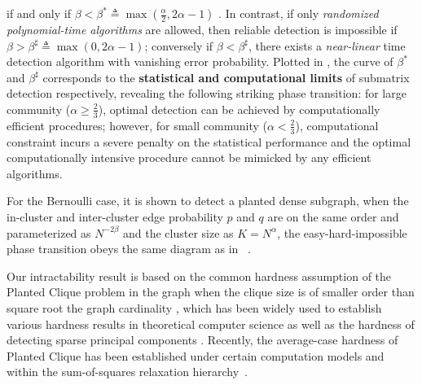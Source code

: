 if and only if $\beta < \beta^* \triangleq \max(\frac{\alpha}{2}, 2\alpha-1)$
 \cite{butucea2013}.
In contrast, if only \emph{randomized polynomial-time algorithms} are allowed, then reliable detection is impossible if $\beta > \beta^\sharp \triangleq \max(0, 2\alpha-1)$; conversely if $\beta < \beta^\sharp$, there exists a \emph{near-linear} time detection algorithm with vanishing error probability. Plotted in , the curve of $\beta^*$ and $\beta^\sharp$ corresponds to the  \textbf{statistical and computational limits} of submatrix detection respectively,  revealing the following striking phase transition: for large community ($\alpha \geq \frac{2}{3}$), optimal detection can be achieved by computationally efficient procedures; however, for small community ($\alpha < \frac{2}{3}$), computational constraint incurs a severe penalty on the statistical performance and the optimal computationally intensive procedure cannot be mimicked by any efficient algorithms. 

For the Bernoulli case, it is shown to detect a planted dense subgraph, when the in-cluster and inter-cluster edge probability $p$ and $q $ are on the same order and parameterized as $N^{-2\beta}$ and the cluster size as $K=N^{\alpha}$, the easy-hard-impossible phase transition obeys the same diagram as in ~\cite{HajekWuXu14}.





Our intractability result is based on the common hardness assumption of the Planted Clique problem in the \ER graph
when the clique size is of smaller order than square root the graph cardinality \cite{Alon98}, which has been widely used to establish various hardness results in theoretical computer science  \cite{Hazan2011Nash,AAK07,KZ12,Kuvcera92,JP00,ABW10} as well as the hardness of detecting sparse principal components \cite{berthet2013lowerSparsePCA}. 
Recently, the average-case hardness of Planted Clique has been established under certain computation models \cite{Rossman10,Feldman13}
and within the sum-of-squares relaxation hierarchy~\cite{Meka15,DeshpandeMontanari15,barak-etal-planted-clique}.







